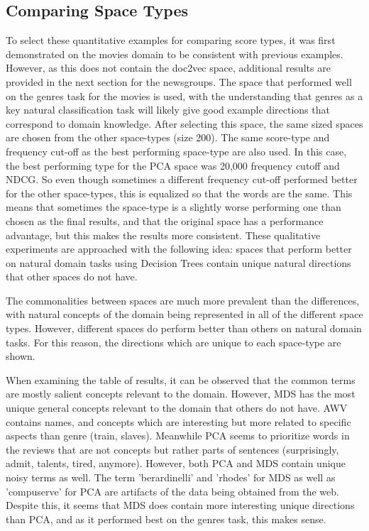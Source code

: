 \subsection{Comparing Space Types}

To select these quantitative examples for  comparing score types, it was first demonstrated on the movies domain to be consistent with previous examples. However, as this does not contain the doc2vec space, additional results are provided in the next section for the newsgroups. The space that performed well on the genres task for the movies is used, with the understanding that genres as a key natural classification task will likely give good example directions that correspond to domain knowledge. After selecting this space, the same sized spaces are chosen from the other space-types (size 200). The same score-type and frequency cut-off  as the best performing space-type are also used. In this case, the best performing type for the PCA space was 20,000 frequency cutoff and NDCG. So even though sometimes a different frequency cut-off performed better for the other space-types, this is equalized so that the words are the same. This means that sometimes the space-type is  a slightly worse performing one than chosen as the final results, and that the original space has a performance advantage, but this makes the results more consistent. These qualitative experiments are approached with the following idea: spaces that perform better on natural domain tasks using Decision Trees contain unique natural directions that other spaces do not have. 

The commonalities between spaces are much more prevalent than the differences, with natural concepts of the domain being represented in all of the different space types. However, different spaces do perform better than others on natural domain tasks. For this reason, the directions which are unique to each space-type are shown.

When examining the table of results, it can be observed that the common terms are mostly salient concepts relevant to the domain. However, MDS has the most unique general concepts relevant to the domain that others do not have. AWV contains names, and concepts which are interesting but more related to specific aspects than genre (train, slaves). Meanwhile PCA seems to prioritize words in the reviews that are not concepts but rather parts of sentences (surprisingly, admit, talents, tired, anymore). However, both PCA and MDS contain unique noisy terms as well. The term 'berardinelli' and 'rhodes' for MDS as well as 'compuserve' for PCA are artifacts of the data being obtained from the web. Despite this, it seems that MDS does contain more interesting unique directions than PCA, and as it performed best on the genres task, this makes sense.

